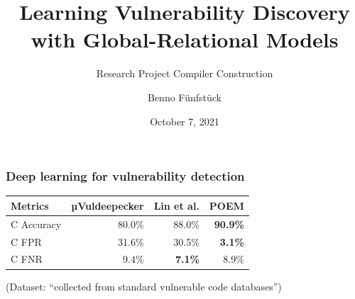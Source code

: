 \documentclass[169,xcolor=table]{beamer}
\title{Learning Vulnerability Discovery with Global-Relational Models}
\subtitle{Research Project Compiler Construction}
\author{Benno Fünfstück}
\date{October 7, 2021}
\begin{document}



\newcommand\makenode[2]{%
  \tikz[baseline=0pt, remember picture] { \node[fill=gray!50,thick,rounded corners,anchor=base,#1/.try] (listings-\the\value{tmlistings}) {{\scriptsize\the\value{tmlistings}} #2}; }%
  \stepcounter{tmlistings}%
}

\maketitle

\begin{frame}\frametitle{Deep learning for vulnerability detection}
  \begin{tabular}{lrrr}
    \toprule
    Metrics & µVuldeepecker & Lin et al. & {\bfseries POEM} \\
    \midrule
    C Accuracy & 80.0\% & 88.0\% & \bfseries{90.9\%} \\
    C FPR      & 31.6\% & 30.5\% & \bfseries{3.1\%} \\
    C FNR      & 9.4\%  & \bfseries{7.1\%}  & 8.9\% \\
    \bottomrule
  \end{tabular}


  (Dataset: ``collected from standard vulnerable code databases'')
\end{frame}
\end{document}
